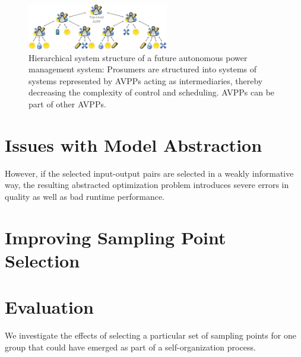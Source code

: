 \documentclass[conference]{IEEEtran}
\begin{document}
\begin{figure}
		\centering
		 \includegraphics[width=0.55\textwidth]{img/avpp-hierarchical-system-structure.pdf}
			\caption{Hierarchical system structure of a future autonomous power management system: Prosumers are structured into systems of systems represented by AVPPs acting as intermediaries, thereby decreasing the complexity of control and scheduling. AVPPs can be part of other AVPPs.}
		\label{fig:avpp-hierarchical-system-structure}
\end{figure}


\section{Issues with Model Abstraction}
However, if
the selected input-output pairs are selected in a weakly informative way, the resulting abstracted
optimization problem introduces severe errors in quality as well as bad runtime performance.

\section{Improving Sampling Point Selection}

\section{Evaluation}
We investigate the effects of selecting a particular set of 
sampling points for one group that could have emerged as part
of a self-organization process.





\end{document}
